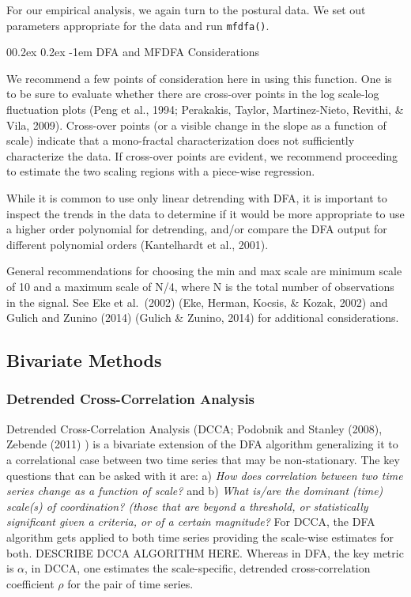 \documentclass[
  man]{apa6}
\makeatletter
\let\oldparagraph\paragraph
\renewcommand{\paragraph}[1]{\oldparagraph{#1}\mbox{}}
\renewcommand{\paragraph}{\@startsection{paragraph}{4}{\parindent}%
  {0\baselineskip \@plus 0.2ex \@minus 0.2ex}%
  {-1em}%
  {\normalfont\normalsize\bfseries\itshape\typesectitle}}
\makeatother
\begin{document}
For our empirical analysis, we again turn to the postural data. We set
out parameters appropriate for the data and run \texttt{mfdfa()}.

\hypertarget{dfa-and-mfdfa-considerations}{%
\paragraph{DFA and MFDFA Considerations}\label{dfa-and-mfdfa-considerations}}

We recommend a few points of consideration here in using this function.
One is to be sure to evaluate whether there are cross-over points in the
log scale-log fluctuation plots (Peng et al., 1994; Perakakis, Taylor, Martinez-Nieto, Revithi, \& Vila, 2009). Cross-over points (or a visible change in the slope as
a function of scale) indicate that a mono-fractal characterization does
not sufficiently characterize the data. If cross-over points are
evident, we recommend proceeding to estimate the two scaling regions
with a piece-wise regression.

While it is common to use only linear detrending with DFA, it is
important to inspect the trends in the data to determine if it would be
more appropriate to use a higher order polynomial for detrending, and/or
compare the DFA output for different polynomial orders
(Kantelhardt et al., 2001).

General recommendations for choosing the min and max scale are minimum
scale of 10 and a maximum scale of N/4, where N is the total number of
observations in the signal. See Eke et al.~(2002)
(Eke, Herman, Kocsis, \& Kozak, 2002) and Gulich and Zunino (2014)
(Gulich \& Zunino, 2014) for additional
considerations.

\hypertarget{bivariate-methods}{%
\subsection{Bivariate Methods}\label{bivariate-methods}}

\hypertarget{detrended-cross-correlation-analysis}{%
\subsubsection{Detrended Cross-Correlation Analysis}\label{detrended-cross-correlation-analysis}}

Detrended Cross-Correlation Analysis (DCCA;
Podobnik and Stanley (2008),
Zebende (2011) ) is a bivariate extension
of the DFA algorithm generalizing it to a correlational case between two
time series that may be non-stationary. The key questions that can be
asked with it are: a) \emph{How does correlation between two time series
change as a function of scale?} and b) \emph{What is/are the dominant (time)
scale(s) of coordination? (those that are beyond a threshold, or
statistically significant given a criteria, or of a certain magnitude?}
For DCCA, the DFA algorithm gets applied to both time series providing
the scale-wise estimates for both. DESCRIBE DCCA ALGORITHM HERE. Whereas
in DFA, the key metric is \(\alpha\), in DCCA, one estimates the
scale-specific, detrended cross-correlation coefficient \(\rho\) for the
pair of time series.
\end{document}
